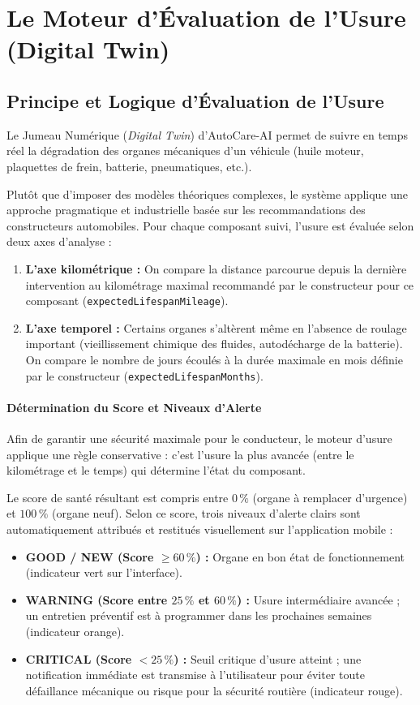 \documentclass[12pt,a4paper,oneside]{report}
\newcommand{\bpuce}{\textcolor{midBlue}{$\blacktriangleright$}\;}
\begin{document}
\section{Le Moteur d'\'Evaluation de l'Usure (Digital Twin)}

\subsection{Principe et Logique d'\'Evaluation de l'Usure}
Le Jumeau Num\'erique (\textit{Digital Twin}) d'AutoCare-AI permet de suivre en temps r\'eel la d\'egradation des organes m\'ecaniques d'un v\'ehicule (huile moteur, plaquettes de frein, batterie, pneumatiques, etc.). 

Plut\^ot que d'imposer des mod\`eles th\'eoriques complexes, le syst\`eme applique une approche pragmatique et industrielle bas\'ee sur les recommandations des constructeurs automobiles. Pour chaque composant suivi, l'usure est \'evalu\'ee selon deux axes d'analyse :
\begin{enumerate}[label=\textbf{\arabic*.}]
  \item \textbf{L'axe kilom\'etrique :} On compare la distance parcourue depuis la derni\`ere intervention au kilom\'etrage maximal recommand\'e par le constructeur pour ce composant (\texttt{expectedLifespanMileage}).
  \item \textbf{L'axe temporel :} Certains organes s'alt\`erent m\^eme en l'absence de roulage important (vieillissement chimique des fluides, autod\'echarge de la batterie). On compare le nombre de jours \'ecoul\'es \`a la dur\'ee maximale en mois d\'efinie par le constructeur (\texttt{expectedLifespanMonths}).
\end{enumerate}

\paragraph{D\'etermination du Score et Niveaux d'Alerte}
Afin de garantir une s\'ecurit\'e maximale pour le conducteur, le moteur d'usure applique une r\`egle conservative : c'est l'usure la plus avanc\'ee (entre le kilom\'etrage et le temps) qui d\'etermine l'\'etat du composant. 

Le score de sant\'e r\'esultant est compris entre $0\,\%$ (organe \`a remplacer d'urgence) et $100\,\%$ (organe neuf). Selon ce score, trois niveaux d'alerte clairs sont automatiquement attribu\'es et restitu\'es visuellement sur l'application mobile :
\begin{itemize}[label=\bpuce]
  \item \textbf{GOOD / NEW (Score $\ge 60\,\%$) :} Organe en bon \'etat de fonctionnement (indicateur vert sur l'interface).
  \item \textbf{WARNING (Score entre $25\,\%$ et $60\,\%$) :} Usure interm\'ediaire avanc\'ee ; un entretien pr\'eventif est \`a programmer dans les prochaines semaines (indicateur orange).
  \item \textbf{CRITICAL (Score $< 25\,\%$) :} Seuil critique d'usure atteint ; une notification imm\'ediate est transmise \`a l'utilisateur pour \'eviter toute d\'efaillance m\'ecanique ou risque pour la s\'ecurit\'e routi\`ere (indicateur rouge).
\end{itemize}
\end{document}
